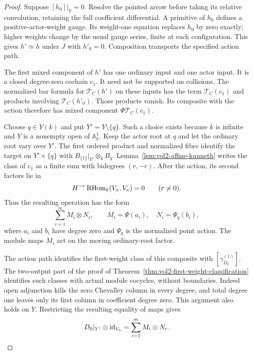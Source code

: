 \begin{proof}
Suppose $[h_0]|_Y=0$. Resolve the pointed arrow before taking
its relative convolution, retaining the full coefficient
differential. A primitive of $h_0$ defines a positive-actor-weight
gauge. Its weight-one equation replaces $h_0$ by zero exactly;
higher weights change by the usual gauge series, finite at each
configuration. This gives $h'\simeq h$ under $J$ with $h'_0=0$.
Composition transports the specified action path.

The first mixed component of $h'$ has one ordinary input and
one actor input. It is a closed degree-zero cochain $c_1$.
It need not be supported on collisions.
The normalized bar formula for $\mathcal T_C(h')$ on these inputs
has the term $\mathcal T_C(c_1)$ and products involving
$\mathcal T_C(h'_0)$. Those products vanish. Its composite
with the action therefore has mixed component
$\Phi\mathcal T_C(c_1)$.

Choose $q\in Y(k)$ and put $Y'=Y\setminus\{q\}$.
Such a choice exists because $k$ is infinite and $Y$ is a nonempty
open of $\mathbb A^1_k$.
Keep the actor root at $q$ and let the ordinary root vary over $Y'$.
The first ordered product and normalized fibre identify the target
on $Y'\times\{q\}$ with $B_{\{1\}}|_{Y'}\otimes_kB_q$.
Lemma~\ref{lem:vol2-affine-kunneth} writes the class of $c_1$
as a finite sum with bidegrees $(r,-r)$.
After the action, its second factors lie in
\[
 H^{-r}\operatorname{RHom}_k(V_\kappa,V_\kappa)=0\qquad(r\ne0).
\]
Thus the resulting operation has the form
\[
 \sum_{i=1}^m M_i\otimes N_i,\qquad
 M_i=\Psi(a_i),\quad N_i=\Psi_q(b_i),
\]
where $a_i$ and $b_i$ have degree zero and $\Psi_q$ is the
normalized point action. The module maps $M_i$ act on the moving
ordinary-root factor.

The action path identifies the first-weight class of this composite
with $[\gamma_{D_0}^{(1)}]$.
The two-output part of the proof of
Theorem~\ref{thm:vol2-first-weight-classification} identifies such
classes with actual module cocycles, without boundaries.
Indeed open adjunction kills the zero Chevalley column in every
degree, and total degree one leaves only its first column in
coefficient degree zero. This argument also holds on $Y$.
Restricting the resulting equality of maps gives
\begin{equation}\label{eq:vol2-singleton-finite-sum}
 D_0|_{Y'}\otimes\mathrm{id}_{V_\kappa}
       =\sum_{i=1}^m M_i\otimes N_i.
\end{equation}


\end{proof}
